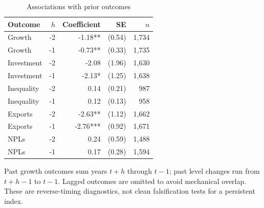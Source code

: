 \begin{table}[!htbp]
\centering\small
\caption{Associations with prior outcomes}\label{tab:placebo}
\begin{tabular}{lrrrr}\toprule
Outcome & $h$ & Coefficient & SE & $n$ \\
\midrule
Growth & -2 & -1.18** & (0.54) & 1,734 \\
Growth & -1 & -0.73** & (0.33) & 1,735 \\
Investment & -2 & -2.08 & (1.96) & 1,630 \\
Investment & -1 & -2.13* & (1.25) & 1,638 \\
Inequality & -2 & 0.14 & (0.21) & 987 \\
Inequality & -1 & 0.12 & (0.13) & 958 \\
Exports & -2 & -2.63** & (1.12) & 1,662 \\
Exports & -1 & -2.76*** & (0.92) & 1,671 \\
NPLs & -2 & 0.24 & (0.59) & 1,488 \\
NPLs & -1 & 0.17 & (0.28) & 1,594 \\
\bottomrule\end{tabular}
\par\smallskip\begin{minipage}{0.98\linewidth}\footnotesize Past growth outcomes sum years $t+h$ through $t-1$; past level changes run from $t+h-1$ to $t-1$. Lagged outcomes are omitted to avoid mechanical overlap. These are reverse-timing diagnostics, not clean falsification tests for a persistent index.\end{minipage}
\end{table}
